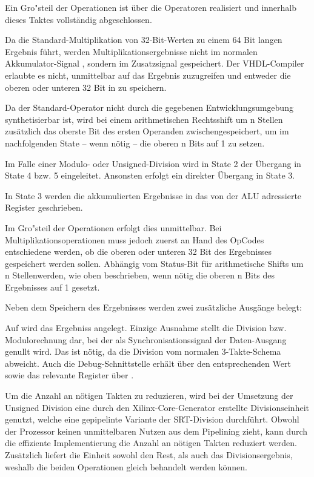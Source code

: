 Ein Gro"steil der Operationen ist \"uber die  Operatoren realisiert und innerhalb dieses Taktes vollständig abgeschlossen.

Da die Standard-Multiplikation von 32-Bit-Werten zu einem 64 Bit langen Ergebnis f\"uhrt, werden Multiplikationsergebnisse nicht im normalen Akkumulator-Signal , sondern im Zusatzsignal  gespeichert. Der VHDL-Compiler erlaubte es nicht, unmittelbar auf das Ergebnis zuzugreifen und entweder die oberen oder unteren 32 Bit in  zu speichern.\vspace{10pt}

Da der Standard-Operator  nicht durch die gegebenen Entwicklungsumgebung synthetisierbar ist, wird bei einem arithmetischen Rechtsshift um {n} Stellen zus\"atzlich das oberste Bit des ersten Operanden zwischengespeichert, um im nachfolgenden State – wenn n\"otig – die oberen {n} Bits auf {1} zu setzen.\vspace{10pt}

Im Falle einer Modulo- oder Unsigned-Division wird in State 2 der \"Ubergang in State 4 bzw. 5 eingeleitet. Ansonsten erfolgt ein direkter \"Ubergang in State 3.

In State 3 werden die akkumulierten Ergebnisse in das von der ALU adressierte Register geschrieben.

Im Gro"steil der Operationen erfolgt dies unmittelbar. Bei Multiplikationsoperationen muss jedoch zuerst an Hand des OpCodes entschiedene werden, ob die oberen oder unteren 32 Bit des Ergebnisses gespeichert werden sollen. Abh\"angig vom Status-Bit f\"ur arithmetische Shifts um {n} Stellenwerden, wie oben beschrieben, wenn n\"otig die oberen n Bits des Ergebnisses auf {1} gesetzt.\vspace{10pt}


Neben dem Speichern des Ergebnisses werden zwei zus\"atzliche Ausg\"ange belegt:

Auf  wird das Ergebniss angelegt. Einzige Ausnahme stellt die Division bzw. Modulorechnung dar, bei der als Synchronisationssignal der Daten-Ausgang genullt wird. Das ist n\"otig, da die Division vom normalen 3-Takte-Schema abweicht.
Auch die Debug-Schnittstelle erh\"alt \"uber  den entsprechenden Wert sowie das relevante Register \"uber .

Um die Anzahl an n\"otigen Takten zu reduzieren, wird bei der Umsetzung der Unsigned Division eine durch den Xilinx-Core-Generator erstellte Divisionseinheit genutzt, welche eine gepipelinte Variante der SRT-Division durchf\"uhrt. Obwohl der Prozessor keinen unmittelbaren Nutzen aus dem Pipelining zieht, kann durch die effiziente Implementierung die Anzahl an n\"otigen Takten reduziert werden. Zus\"atzlich liefert die Einheit sowohl den Rest, als auch das Divisionsergebnis, weshalb die beiden Operationen gleich behandelt werden k\"onnen.


